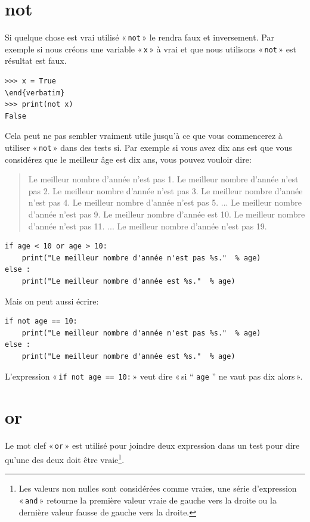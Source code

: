 \section*{not}
Si quelque chose est vrai utilisé « \texttt{not} » le rendra faux et inversement. Par exemple si nous créons une variable « \texttt{x} »  à vrai et que nous utilisons « \texttt{not} » est résultat est faux.
\begin{Verbatim}[frame=single,rulecolor=\color{gray}]
>>> x = True
\end{verbatim}
>>> print(not x)
False
\end{Verbatim}

Cela peut ne pas sembler vraiment utile jusqu'à ce que vous commencerez à utiliser « \texttt{not} »  dans des tests si. Par exemple si vous avez dix ans est que vous considérez que le meilleur âge est dix ans, vous pouvez vouloir dire:

\begin{quotation}
Le meilleur nombre d'année n'est pas 1.
Le meilleur nombre d'année n'est pas 2.
Le meilleur nombre d'année n'est pas 3.
Le meilleur nombre d'année n'est pas 4.
Le meilleur nombre d'année n'est pas 5.
...
Le meilleur nombre d'année n'est pas 9.
Le meilleur nombre d'année est 10.
Le meilleur nombre d'année n'est pas 11.
...
Le meilleur nombre d'année n'est pas 19.
\end{quotation}

\begin{Verbatim}[frame=single,rulecolor=\color{gray}]
if age < 10 or age > 10:
    print("Le meilleur nombre d'année n'est pas %s."  % age)
else :
    print("Le meilleur nombre d'année est %s."  % age)
\end{Verbatim}

Mais on peut aussi écrire:

\begin{Verbatim}[frame=single,rulecolor=\color{gray}]
if not age == 10:
    print("Le meilleur nombre d'année n'est pas %s."  % age)
else :
    print("Le meilleur nombre d'année est %s."  % age)
\end{Verbatim}

L'expression « \texttt{if not age == 10:} » veut dire « si “ \texttt{age} ” ne vaut pas dix alors ».


\section*{or}

Le mot clef « \texttt{or} » est utilisé pour joindre deux expression dans un test pour dire qu'une des deux doit être vraie\footnote{Les valeurs non nulles sont considérées comme vraies, une série d'expression « \texttt{and} » retourne la première valeur vraie de gauche vers la droite ou la  dernière valeur fausse de gauche vers la droite.}.

